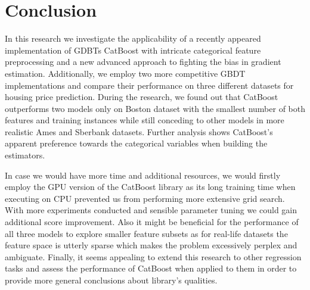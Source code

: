\section{Conclusion}
\label{sec:conclusion}

In this research we investigate the applicability of a recently appeared implementation of GDBTs CatBoost with intricate categorical feature preprocessing and a new advanced approach to fighting the bias in gradient estimation. Additionally, we employ two more competitive GBDT implementations and compare their performance on three different datasets for housing price prediction. During the research, we found out that CatBoost outperforms two models only on Boston dataset with the smallest number of both features and training instances while still conceding to other models in more realistic Ames and Sberbank datasets. Further analysis shows CatBoost's apparent preference towards the categorical variables when building the estimators.

In case we would have more time and additional resources, we would firstly employ the GPU version of the CatBoost library as its long training time when executing on CPU prevented us from performing more extensive grid search. With more experiments conducted and sensible parameter tuning we could gain additional score improvement. Also it might be beneficial for the performance of all three models to explore smaller feature subsets as for real-life datasets the feature space is utterly sparse which makes the problem excessively perplex and ambiguate. Finally, it seems appealing to extend this research to other regression tasks and assess the performance of CatBoost when applied to them in order to provide more general conclusions about library's qualities.